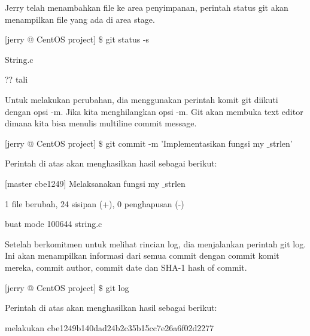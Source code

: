 \vspace{12pt}
\noindent 
Jerry telah menambahkan file ke area penyimpanan, perintah status git akan menampilkan file yang ada di area stage. \par
\noindent 
 \hspace*{0.5in} [jerry @ CentOS project]  $  \$  $ git status -s \par
\noindent 
 \hspace*{0.5in} String.c \par
\noindent 
 \hspace*{0.5in} ?? tali \par
\vspace{12pt}
\noindent 
Untuk melakukan perubahan, dia menggunakan perintah komit git diikuti dengan opsi -m. Jika kita menghilangkan opsi -m. Git akan membuka text editor dimana kita bisa menulis multiline commit message. \par
\noindent 
 \hspace*{0.5in} [jerry @ CentOS project]  $  \$  $ git commit -m 'Implementasikan fungsi my $  \_  $strlen' \par
\noindent 
 \hspace*{0.5in} Perintah di atas akan menghasilkan hasil sebagai berikut: \par
\noindent 
 \hspace*{0.5in} [master cbe1249] Melaksanakan fungsi my $  \_  $strlen \par
\noindent 
 \hspace*{0.5in} 1 file berubah, 24 sisipan (+), 0 penghapusan (-) \par
\noindent 
 \hspace*{0.5in} buat mode 100644 string.c \par
\vspace{12pt}
\vspace{12pt}
\noindent 
Setelah berkomitmen untuk melihat rincian log, dia menjalankan perintah git log. Ini akan menampilkan informasi dari semua commit dengan commit komit mereka, commit author, commit date dan SHA-1 hash of commit. \par
\noindent 
 \hspace*{0.5in} [jerry @ CentOS project]  $  \$  $ git log \par
\noindent 
Perintah di atas akan menghasilkan hasil sebagai berikut: \par
\vspace{12pt}
\noindent 
 \hspace*{0.5in} melakukan cbe1249b140dad24b2c35b15cc7e26a6f02d2277 \par
